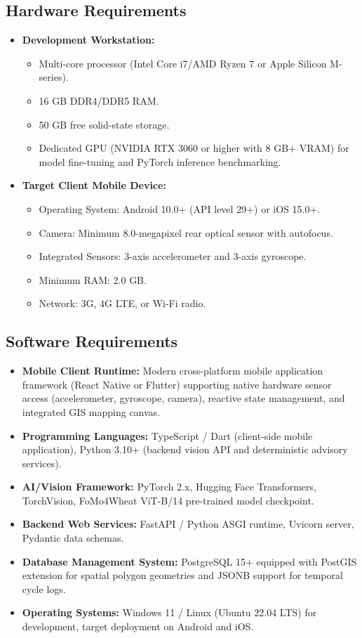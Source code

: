 \documentclass{FastFyp}
\begin{document}
\subsection{Hardware Requirements}
\begin{itemize}
    \item \textbf{Development Workstation:}
    \begin{itemize}
        \item Multi-core processor (Intel Core i7/AMD Ryzen 7 or Apple Silicon M-series).
        \item 16 GB DDR4/DDR5 RAM.
        \item 50 GB free solid-state storage.
        \item Dedicated GPU (NVIDIA RTX 3060 or higher with 8 GB+ VRAM) for model fine-tuning and PyTorch inference benchmarking.
    \end{itemize}
    \item \textbf{Target Client Mobile Device:}
    \begin{itemize}
        \item Operating System: Android 10.0+ (API level 29+) or iOS 15.0+.
        \item Camera: Minimum 8.0-megapixel rear optical sensor with autofocus.
        \item Integrated Sensors: 3-axis accelerometer and 3-axis gyroscope.
        \item Minimum RAM: 2.0 GB.
        \item Network: $3\text{G}$, $4\text{G}$ LTE, or Wi-Fi radio.
    \end{itemize}
\end{itemize}

\subsection{Software Requirements}
\begin{itemize}
    \item \textbf{Mobile Client Runtime:} Modern cross-platform mobile application framework (React Native or Flutter) supporting native hardware sensor access (accelerometer, gyroscope, camera), reactive state management, and integrated GIS mapping canvas.
    \item \textbf{Programming Languages:} TypeScript / Dart (client-side mobile application), Python 3.10+ (backend vision API and deterministic advisory services).
    \item \textbf{AI/Vision Framework:} PyTorch 2.x, Hugging Face Transformers, TorchVision, FoMo4Wheat ViT-B/14 pre-trained model checkpoint.
    \item \textbf{Backend Web Services:} FastAPI / Python ASGI runtime, Uvicorn server, Pydantic data schemas.
    \item \textbf{Database Management System:} PostgreSQL 15+ equipped with PostGIS extension for spatial polygon geometries and JSONB support for temporal cycle logs.
    \item \textbf{Operating Systems:} Windows 11 / Linux (Ubuntu 22.04 LTS) for development, target deployment on Android and iOS.
\end{itemize}
\end{document}
